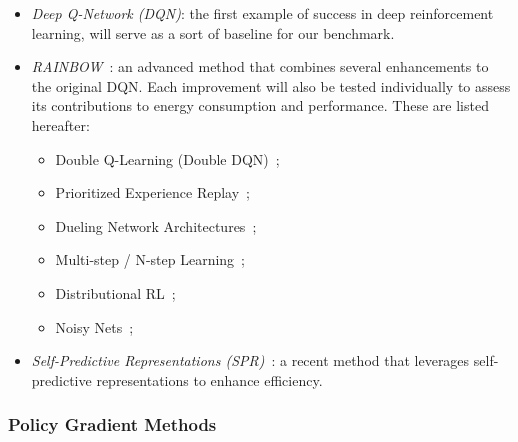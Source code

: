 \begin{itemize}
	\item \textit{Deep Q-Network (DQN)}: the first example of success in deep reinforcement learning, will serve as a sort of baseline for our benchmark.
	\item \textit{RAINBOW}~\cite{hessel:rainbow}: an advanced method that combines several enhancements to the original DQN. Each improvement will also be tested individually to assess its contributions to energy consumption and performance. These are listed hereafter:
	\begin{itemize}
		\item Double Q-Learning (Double DQN)~\cite{van:double_q};
		\item Prioritized Experience Replay~\cite{schaul:prioritized};
		\item Dueling Network Architectures~\cite{wang:dueling};
		\item Multi-step / N-step Learning~\cite{peng:incremental};
		\item Distributional RL~\cite{bellemare:distributional};
		\item Noisy Nets~\cite{fortunato:noisy};
	\end{itemize}
	\item \textit{Self-Predictive Representations (SPR)}~\cite{schwarzer:spr}: a recent method that leverages self-predictive representations to enhance efficiency.
\end{itemize}

\subsubsection{Policy Gradient Methods}

